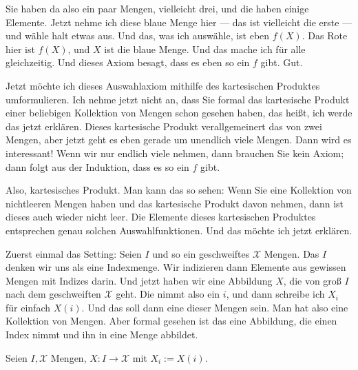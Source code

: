 \begin{spoken-clean}[00:13:50 - 00:15:23]
Sie haben da also ein paar Mengen, vielleicht drei, und die haben einige Elemente. Jetzt nehme ich diese blaue Menge hier --- das ist vielleicht die erste --- und wähle halt etwas aus. Und das, was ich auswähle, ist eben $f(X)$. Das Rote hier ist $f(X)$, und $X$ ist die blaue Menge. Und das mache ich für alle gleichzeitig. Und dieses Axiom besagt, dass es eben so ein $f$ gibt. Gut.

Jetzt möchte ich dieses Auswahlaxiom mithilfe des kartesischen Produktes umformulieren. Ich nehme jetzt nicht an, dass Sie formal das kartesische Produkt einer beliebigen Kollektion von Mengen schon gesehen haben, das heißt, ich werde das jetzt erklären. Dieses kartesische Produkt verallgemeinert das von zwei Mengen, aber jetzt geht es eben gerade um unendlich viele Mengen. Dann wird es interessant! Wenn wir nur endlich viele nehmen, dann brauchen Sie kein Axiom; dann folgt aus der Induktion, dass es so ein $f$ gibt. 

Also, kartesisches Produkt. Man kann das so sehen: Wenn Sie eine Kollektion von nichtleeren Mengen haben und das kartesische Produkt davon nehmen, dann ist dieses auch wieder nicht leer. Die Elemente dieses kartesischen Produktes entsprechen genau solchen Auswahlfunktionen. Und das möchte ich jetzt erklären.

Zuerst einmal das Setting: Seien $I$ und so ein geschweiftes $\mathcal{X}$ Mengen. Das $I$ denken wir uns als eine Indexmenge. Wir indizieren dann Elemente aus gewissen Mengen mit Indizes darin. Und jetzt haben wir eine Abbildung $X$, die von groß $I$ nach dem geschweiften $\mathcal{X}$ geht. Die nimmt also ein $i$, und dann schreibe ich $X_i$ für einfach $X(i)$. Und das soll dann eine dieser Mengen sein. Man hat also eine Kollektion von Mengen. Aber formal gesehen ist das eine Abbildung, die einen Index nimmt und ihn in eine Menge abbildet.
\end{spoken-clean}

\begin{math-stroke}
Seien $I, \mathcal{X}$ Mengen, $X: I \to \mathcal{X}$ mit $X_i := X(i)$.

\end{math-stroke}

